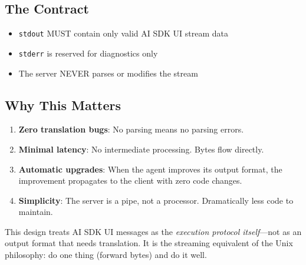 \subsection{The Contract}

\begin{itemize}[nosep]
\item \texttt{stdout} MUST contain only valid AI SDK UI stream data
\item \texttt{stderr} is reserved for diagnostics only
\item The server NEVER parses or modifies the stream
\end{itemize}

\subsection{Why This Matters}

\begin{enumerate}[nosep]
\item \textbf{Zero translation bugs}: No parsing means no parsing errors.
\item \textbf{Minimal latency}: No intermediate processing. Bytes flow directly.
\item \textbf{Automatic upgrades}: When the agent improves its output format, the improvement propagates to the client with zero code changes.
\item \textbf{Simplicity}: The server is a pipe, not a processor. Dramatically less code to maintain.
\end{enumerate}

This design treats AI SDK UI messages as the \textit{execution protocol itself}---not as an output format that needs translation. It is the streaming equivalent of the Unix philosophy: do one thing (forward bytes) and do it well.
